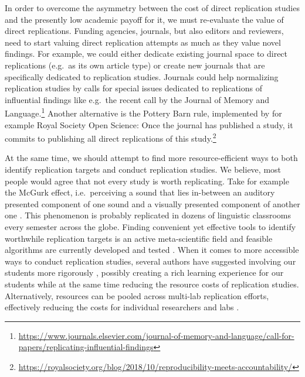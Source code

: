 \documentclass[cm,linguex]{glossa}
\begin{document}
In order to overcome the asymmetry between the cost of direct replication studies and the presently low academic payoff for it, we must re-evaluate the value of direct replications. Funding agencies, journals, but also editors and reviewers, need to start valuing direct replication attempts as much as they value novel findings. For example, we could either dedicate existing journal space to direct replications (e.g.~as its own article type) or create new journals that are specifically dedicated to replication studies.
Journals could help normalizing replication studies by calls for special issues dedicated to replications of influential findings like e.g.~the recent call by the Journal of Memory and Language.\footnote{\url{https://www.journals.elsevier.com/journal-of-memory-and-language/call-for-papers/replicating-influential-findings}}
Another alternative is the Pottery Barn rule, implemented by for example Royal Society Open Science: Once the journal has published a study, it commits to publishing all direct replications of this study.\footnote{ \url{https://royalsociety.org/blog/2018/10/reproducibility-meets-accountability/}}

At the same time, we should attempt to find more resource-efficient ways to both identify replication targets and conduct replication studies. We believe, most people would agree that not every study is worth replicating. Take for example the McGurk effect, i.e.~perceiving a sound that lies in-between an auditory presented component of one sound and a visually presented component of another one \citep{mcgurk1976hearing}. This phenomenon is probably replicated in dozens of linguistic classrooms every semester across the globe. Finding convenient yet effective tools to identify worthwhile replication targets is an active meta-scientific field \citep[e.g.,][]{coles2018costs, isager2021deciding, hardwicke2018bayesian} and feasible algorithms are currently developed and tested \citep{isager2021replication}.
When it comes to more accessible ways to conduct replication studies, several authors have suggested involving our students more rigorously \citep[e.g.,][]{de2019using, frank2012teaching, grahe2012harnessing, roettger_toward_2019}, possibly creating a rich learning experience for our students while at the same time reducing the resource costs of replication studies. Alternatively, resources can be pooled across multi-lab replication efforts, effectively reducing the costs for individual researchers and labs \citep[e.g.,][]{frank2017collaborative, nieuwland_large-scale_2018, open_science_collaboration_estimating_2015}.
\end{document}
